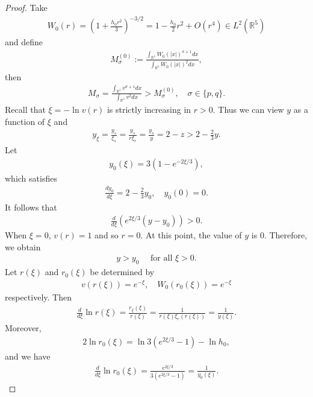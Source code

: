 \documentclass{article}
\theoremstyle{definition} \theoremstyle{remark}
\numberwithin{equation}{section}
\newcommand{\R}{\mathbb{R}}
\begin{document}
\begin{proof}
\vskip0.12in
 Take
		\begin{align} \label{def:W_0(r)}
			W_0(r) = \left(1 + \frac{h_0r^2}{3}\right)^{-3/2} = 1 - \frac{h_0}{2}r^2 + O(r^4) \in L^2(\R^5)
		\end{align}
		and define
		\begin{align*}
			M_\sigma^{(0)} := \frac{\int_{\R^5}W_0(|x|)^{\sigma +1}dx}{\int_{\R^5}W_0(|x|)^2dx},
		\end{align*}
		then
		\begin{align} \label{M>M0}
			M_\sigma = \frac{\int_{\R^5}v^{\sigma +1}dx}{\int_{\R^5}v^2dx} > M_\sigma^{(0)}, \quad \sigma \in \{p,q\}.
		\end{align}
Recall that $\xi = -\ln v(r)$ is strictly increasing in $r > 0$. Thus we can view $y$ as a function of $\xi$ and
		\begin{align}
			y_\xi = \frac{y_s}{\xi_s} = \frac{y_s}{r\xi_r} = \frac{y_s}{y} = 2 - z > 2 - \frac23 y.
		\end{align}
		Let
		\begin{align*}
			y_0(\xi) = 3\left(1 - e^{-2\xi/3}\right),
		\end{align*}
		which satisfies
		\begin{align*}
			\frac{dy_0}{d\xi} = 2 - \frac{2}{3}y_0, \quad y_0(0) = 0.
		\end{align*}
		It follows that
		\begin{align*}
			\frac{d}{d\xi}\left(e^{2\xi/3}(y - y_0)\right) > 0.
		\end{align*}
		When $\xi = 0$, $v(r) = 1$ and so $r = 0$. At this point, the value of $y$ is $0$. Therefore, we obtain
		\begin{align*}
			y > y_0 \quad \text{ for all } \xi > 0.
		\end{align*}
Let $r(\xi)$ and $r_0(\xi)$ be determined by
		\begin{align*}
			v(r(\xi)) = e^{-\xi}, \quad W_0(r_0(\xi)) = e^{-\xi}
		\end{align*}
		respectively. Then
		\begin{align*}
			\frac{d}{d\xi} \ln r(\xi) = \frac{r_\xi(\xi)}{r(\xi)} = \frac{1}{r(\xi)\xi_r(r(\xi))} = \frac{1}{y(\xi)}.
		\end{align*}
		Moreover,
		\begin{align*}
			2\ln r_0(\xi) = \ln 3(e^{2\xi/3} - 1) - \ln h_0,
		\end{align*}
		and we have
		\begin{align*}
			\frac{d}{d\xi} \ln r_0(\xi) = \frac{e^{2\xi/3}}{3(e^{2\xi/3} - 1)} = \frac{1}{y_0(\xi)}.

\end{align*}
\end{proof}
\end{document}
